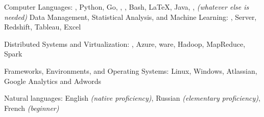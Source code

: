 \documentclass[10pt,letterpaper]{article} %
\begin{document}
\spacedhrule{0.5em}{-0.4em}



\inlineheadsection
    {Computer Languages:}
    {, Python, Go, , , Bash, \LaTeX,
      Java, , \textit{(whatever else is needed)}
    }
    \inlineheadsection
        {Data Management, Statistical Analysis, and Machine Learning:}
        {,  Server, Redshift, Tableau, Excel}

    \inlineheadsection
        {Distributed Systems and Virtualization:}
        {, Azure, ware, Hadoop, MapReduce, Spark}

    \inlineheadsection
        {Frameworks, Environments, and Operating Systems:}
        {Linux, Windows, Atlassian, Google Analytics and Adwords}

    \inlineheadsection
        {Natural languages:}
        {English \textit{(native proficiency)}, Russian
          \textit{(elementary proficiency)}, French \textit{(beginner)}}

\spacedhrule{2.0em}{-0.4em}






\end{document}

